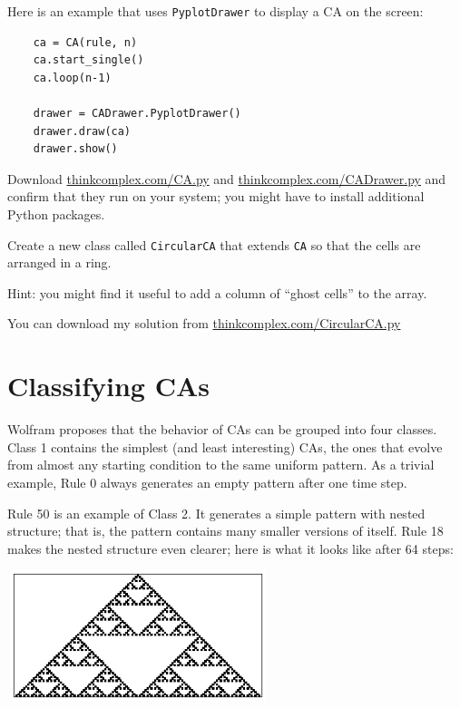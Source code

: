 \documentclass[10pt]{book}
\begin{document}
Here is an example that uses {\tt PyplotDrawer} to display a
CA on the screen:

\begin{verbatim}
    ca = CA(rule, n)
    ca.start_single()
    ca.loop(n-1)

    drawer = CADrawer.PyplotDrawer()
    drawer.draw(ca)
    drawer.show()
\end{verbatim}

\begin{ex}

Download \url{thinkcomplex.com/CA.py} and \url{thinkcomplex.com/CADrawer.py}
and confirm that they run on your system; you might have to install
additional Python packages.

Create a new class called {\tt CircularCA} that extends
{\tt CA} so that the cells are arranged in a ring.

Hint: you might find it useful to add a column of ``ghost cells'' to
the array.

You can download my solution from 
\url{thinkcomplex.com/CircularCA.py}

\end{ex}


\section{Classifying CAs}

Wolfram proposes that the behavior of CAs can be grouped
into four classes.  Class 1 contains the simplest (and least
interesting) CAs, the ones that evolve from almost any starting
condition to the same uniform pattern.  As a trivial example,
Rule 0 always generates an empty pattern after one time step.

Rule 50 is an example of Class 2.  It generates a simple pattern with
nested structure; that is, the pattern contains many smaller versions
of itself.  Rule 18 makes the nested structure even clearer; here is
what it looks like after 64 steps:

\beforefig
\centerline{\includegraphics[width=3.0in,height=1.5in]{figs/rule18.eps}}
\afterfig
\end{document}
